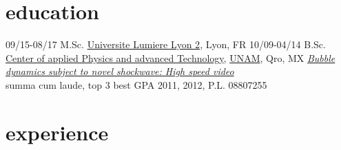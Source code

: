\documentclass[]{friggeri-cv}
\begin{document}
\section{education}

\begin{entrylist}
\entry
{09/15-08/17}
{M.Sc. \href{http://www.em-dmkm.eu/}
             {}}
     {\href{http://www.univ-lyon2.fr/}{Universite Lumiere Lyon 2}, Lyon, FR}
     {%
}
\entry
{10/09-04/14}
{B.Sc. \href{http://www.fata.unam.mx/tecnologia}
             {}}
  {\href{http://www.fata.unam.mx/}{Center of applied Physics and advanced Technology}, \href{http://www.unam.mx/}{UNAM}, Qro, MX}           
{\href{https://dl.dropboxusercontent.com/u/2115508/Tesis.pdf}{\emph{Bubble dynamics subject to novel shockwave: High speed video}}\\
summa cum laude, top 3 best GPA 2011, 2012, P.L. 08807255
}
\end{entrylist}


\section{experience}
\end{document}
